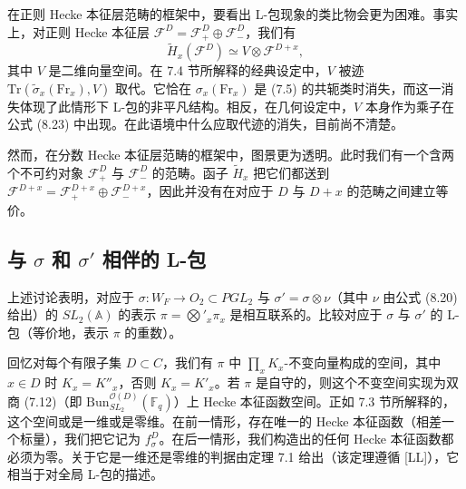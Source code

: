 \documentclass[11pt,a4paper]{article}
\newcommand{\Bun}{\mathrm{Bun}}
\begin{document}
在正则 Hecke 本征层范畴的框架中，要看出 L-包现象的类比物会更为困难。事实上，对正则 Hecke 本征层 $\mathcal{F}^D = \mathcal{F}^D_+\oplus \mathcal{F}^D_-$，我们有
\begin{equation}\tag{8.23}
\tilde{H}_x(\mathcal{F}^D) \simeq V\otimes \mathcal{F}^{D+x},
\end{equation}
其中 $V$ 是二维向量空间。在 7.4 节所解释的经典设定中，$V$ 被迹 $\mathrm{Tr}(\tilde{\sigma}_x(\mathrm{Fr}_x), V)$ 取代。它恰在 $\sigma_x(\mathrm{Fr}_x)$
是 (7.5) 的共轭类时消失，而这一消失体现了此情形下 L-包的非平凡结构。相反，在几何设定中，$V$ 本身作为乘子在公式 (8.23) 中出现。在此语境中什么应取代迹的消失，目前尚不清楚。


然而，在分数 Hecke 本征层范畴的框架中，图景更为透明。此时我们有一个含两个不可约对象 $\mathcal{F}^D_+$ 与 $\mathcal{F}^D_-$ 的范畴。函子 $\tilde{H}_x$ 把它们都送到 $\mathcal{F}^{D+x} = \mathcal{F}^{D+x}_+\oplus \mathcal{F}^{D+x}_-$，因此并没有在对应于 $D$ 与 $D+x$ 的范畴之间建立等价。

\subsection{与 \texorpdfstring{$\sigma$}{σ} 和 \texorpdfstring{$\sigma'$}{σ′} 相伴的 L-包}

上述讨论表明，对应于 $\sigma : W_F \to O_2\subset PGL_2$ 与 $\sigma' = \sigma\otimes\nu$（其中 $\nu$ 由公式 (8.20) 给出）的 $SL_2(\mathbb{A})$ 的表示 $\pi = \bigotimes'_x \pi_x$ 是相互联系的。比较对应于 $\sigma$ 与 $\sigma'$ 的 L-包（等价地，表示 $\pi$ 的重数）。

回忆对每个有限子集 $D\subset C$，我们有 $\pi$ 中 $\prod_x K_x$-不变向量构成的空间，其中 $x\in D$ 时 $K_x = K''_x$，否则 $K_x = K'_x$。若 $\pi$ 是自守的，则这个不变空间实现为双商 (7.12)（即 $\Bun^{\mathcal{O}(D)}_{SL_2}(\mathbb{F}_q)$）上 Hecke 本征函数空间。正如 7.3 节所解释的，这个空间或是一维或是零维。在前一情形，存在唯一的 Hecke 本征函数（相差一个标量），我们把它记为 $f^D_\sigma$。在后一情形，我们构造出的任何 Hecke 本征函数都必须为零。关于它是一维还是零维的判据由定理 7.1 给出（该定理遵循 [LL]），它相当于对全局 L-包的描述。

\end{document}
